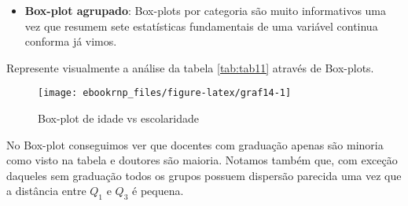 \documentclass[12pt,]{style/krantz}
\makeatletter
\newenvironment{Shaded}{\begin{snugshade}}{\end{snugshade}}
\newcommand{\KeywordTok}[1]{\textcolor[rgb]{0.13,0.29,0.53}{\textbf{#1}}}
\newcommand{\DataTypeTok}[1]{\textcolor[rgb]{0.13,0.29,0.53}{#1}}
\newcommand{\StringTok}[1]{\textcolor[rgb]{0.31,0.60,0.02}{#1}}
\newcommand{\OtherTok}[1]{\textcolor[rgb]{0.56,0.35,0.01}{#1}}
\newcommand{\OperatorTok}[1]{\textcolor[rgb]{0.81,0.36,0.00}{\textbf{#1}}}
\newcommand{\NormalTok}[1]{#1}
\providecommand{\tightlist}{%
  \setlength{\itemsep}{0pt}\setlength{\parskip}{0pt}}
\newenvironment{kframe}{%
\medskip{}
\setlength{\fboxsep}{.8em}
 \def\at@end@of@kframe{}%
 \ifinner\ifhmode%
  \def\at@end@of@kframe{\end{minipage}}%
  \begin{minipage}{\columnwidth}%
 \fi\fi%
 \def\FrameCommand##1{\hskip\@totalleftmargin \hskip-\fboxsep
 \colorbox{shadecolor}{##1}\hskip-\fboxsep
     \hskip-\linewidth \hskip-\@totalleftmargin \hskip\columnwidth}%
 \MakeFramed {\advance\hsize-\width
   \@totalleftmargin\z@ \linewidth\hsize
   \@setminipage}}%
 {\par\unskip\endMakeFramed%
 \at@end@of@kframe}
\renewenvironment{Shaded}{\begin{kframe}}{\end{kframe}}
\theoremstyle{definition}
\theoremstyle{definition}
\theoremstyle{definition}
\theoremstyle{remark}
\let\BeginKnitrBlock\begin \let\EndKnitrBlock\end
\makeatother
\begin{document}
\begin{itemize}
\tightlist
\item
  \textbf{Box-plot agrupado}: Box-plots por categoria são muito
  informativos uma vez que resumem sete estatísticas fundamentais de uma
  variável continua conforma já vimos.
\end{itemize}

\BeginKnitrBlock{example}
\protect\hypertarget{exm:unnamed-chunk-82}{}{\label{exm:unnamed-chunk-82}
}Represente visualmente a análise da tabela \ref{tab:tab11} através de
Box-plots.
\EndKnitrBlock{example}

\begin{Shaded}
\end{Shaded}

\begin{figure}[H]

{\centering \texttt{[image: ebookrnp\_files/figure-latex/graf14-1]} 

}

\caption{Box-plot de idade vs escolaridade}\label{fig:graf14}
\end{figure}

No Box-plot conseguimos ver que docentes com graduação apenas são
minoria como visto na tabela e doutores são maioria. Notamos também que,
com exceção daqueles sem graduação todos os grupos possuem dispersão
parecida uma vez que a distância entre \(Q_1\) e \(Q_3\) é pequena.
\end{document}
